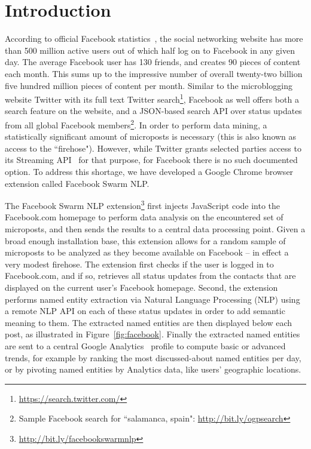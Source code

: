 \documentclass[conference]{IEEEtran}
\begin{document}
\IEEEpeerreviewmaketitle

\section{Introduction}                                                      \label{sec:introduction}
According to official Facebook statistics~\cite{Facebook}, the social networking website has more than 500 million active users out of which half log on to Facebook in any given day. The average Facebook user has 130 friends, and creates 90 pieces of content each month. This sums up to the impressive number of overall twenty-two billion five hundred million pieces of content per month. Similar to the microblogging website Twitter with its full text Twitter search\footnote{\url{https://search.twitter.com/}}, Facebook as well offers both a search feature on the website, and a JSON-based search API over status updates from all global Facebook members\footnote{Sample Facebook search for ``salamanca, spain": \url{http://bit.ly/ogpsearch}}. In order to perform data mining, a statistically significant amount of microposts is necessary (this is also known as access to the ``firehose"). However, while Twitter grants selected parties access to its Streaming API~\cite{Twitter} for that purpose, for Facebook there is no such documented option. To address this shortage, we have developed a Google Chrome browser extension called Facebook Swarm NLP.

The Facebook Swarm NLP extension\footnote{\url{http://bit.ly/facebookswarmnlp}} first injects JavaScript code into the Facebook.com homepage to perform data analysis on the encountered set of microposts, and then sends the results to a central data processing point. Given a broad enough installation base, this extension allows for a random sample of microposts to be analyzed as they become available on Facebook -- in effect a very modest firehose. The extension first checks if the user is logged in to Facebook.com, and if so, retrieves all status updates from the contacts that are displayed on the current user's Facebook homepage. Second, the extension performs named entity extraction via Natural Language Processing (NLP) using a remote NLP API on each of these status updates in order to add semantic meaning to them. The extracted named entities are then displayed below each post, as illustrated in Figure~\ref{fig:facebook}. Finally the extracted named entities are sent to a central Google Analytics~\cite{Kaushik} profile to compute basic or advanced trends, for example by ranking the most discussed-about named entities per day, or by pivoting named entities by Analytics data, like users' geographic locations.
\end{document}
